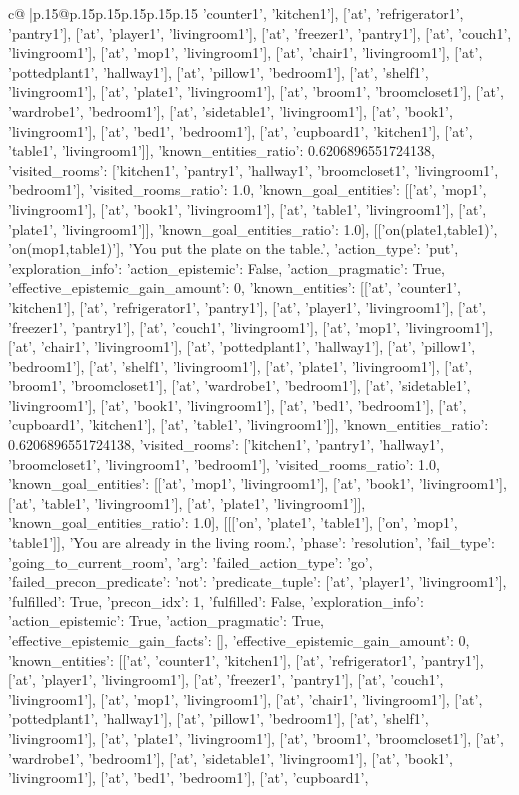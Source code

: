 \documentclass{article}
\begin{document}
{\begin{supertabular}{c@{$\;$}|p{.15\linewidth}@{}p{.15\linewidth}p{.15\linewidth}p{.15\linewidth}p{.15\linewidth}p{.15\linewidth}}
{{{'counter1', 'kitchen1'], ['at', 'refrigerator1', 'pantry1'], ['at', 'player1', 'livingroom1'], ['at', 'freezer1', 'pantry1'], ['at', 'couch1', 'livingroom1'], ['at', 'mop1', 'livingroom1'], ['at', 'chair1', 'livingroom1'], ['at', 'pottedplant1', 'hallway1'], ['at', 'pillow1', 'bedroom1'], ['at', 'shelf1', 'livingroom1'], ['at', 'plate1', 'livingroom1'], ['at', 'broom1', 'broomcloset1'], ['at', 'wardrobe1', 'bedroom1'], ['at', 'sidetable1', 'livingroom1'], ['at', 'book1', 'livingroom1'], ['at', 'bed1', 'bedroom1'], ['at', 'cupboard1', 'kitchen1'], ['at', 'table1', 'livingroom1']], 'known_entities_ratio': 0.6206896551724138, 'visited_rooms': ['kitchen1', 'pantry1', 'hallway1', 'broomcloset1', 'livingroom1', 'bedroom1'], 'visited_rooms_ratio': 1.0, 'known_goal_entities': [['at', 'mop1', 'livingroom1'], ['at', 'book1', 'livingroom1'], ['at', 'table1', 'livingroom1'], ['at', 'plate1', 'livingroom1']], 'known_goal_entities_ratio': 1.0}}], [['on(plate1,table1)', 'on(mop1,table1)'], 'You put the plate on the table.', {'action_type': 'put', 'exploration_info': {'action_epistemic': False, 'action_pragmatic': True, 'effective_epistemic_gain_amount': 0, 'known_entities': [['at', 'counter1', 'kitchen1'], ['at', 'refrigerator1', 'pantry1'], ['at', 'player1', 'livingroom1'], ['at', 'freezer1', 'pantry1'], ['at', 'couch1', 'livingroom1'], ['at', 'mop1', 'livingroom1'], ['at', 'chair1', 'livingroom1'], ['at', 'pottedplant1', 'hallway1'], ['at', 'pillow1', 'bedroom1'], ['at', 'shelf1', 'livingroom1'], ['at', 'plate1', 'livingroom1'], ['at', 'broom1', 'broomcloset1'], ['at', 'wardrobe1', 'bedroom1'], ['at', 'sidetable1', 'livingroom1'], ['at', 'book1', 'livingroom1'], ['at', 'bed1', 'bedroom1'], ['at', 'cupboard1', 'kitchen1'], ['at', 'table1', 'livingroom1']], 'known_entities_ratio': 0.6206896551724138, 'visited_rooms': ['kitchen1', 'pantry1', 'hallway1', 'broomcloset1', 'livingroom1', 'bedroom1'], 'visited_rooms_ratio': 1.0, 'known_goal_entities': [['at', 'mop1', 'livingroom1'], ['at', 'book1', 'livingroom1'], ['at', 'table1', 'livingroom1'], ['at', 'plate1', 'livingroom1']], 'known_goal_entities_ratio': 1.0}}], [[['on', 'plate1', 'table1'], ['on', 'mop1', 'table1']], 'You are already in the living room.', {'phase': 'resolution', 'fail_type': 'going_to_current_room', 'arg': {'failed_action_type': 'go', 'failed_precon_predicate': {'not': {'predicate_tuple': ['at', 'player1', 'livingroom1'], 'fulfilled': True, 'precon_idx': 1}, 'fulfilled': False}}, 'exploration_info': {'action_epistemic': True, 'action_pragmatic': True, 'effective_epistemic_gain_facts': [], 'effective_epistemic_gain_amount': 0, 'known_entities': [['at', 'counter1', 'kitchen1'], ['at', 'refrigerator1', 'pantry1'], ['at', 'player1', 'livingroom1'], ['at', 'freezer1', 'pantry1'], ['at', 'couch1', 'livingroom1'], ['at', 'mop1', 'livingroom1'], ['at', 'chair1', 'livingroom1'], ['at', 'pottedplant1', 'hallway1'], ['at', 'pillow1', 'bedroom1'], ['at', 'shelf1', 'livingroom1'], ['at', 'plate1', 'livingroom1'], ['at', 'broom1', 'broomcloset1'], ['at', 'wardrobe1', 'bedroom1'], ['at', 'sidetable1', 'livingroom1'], ['at', 'book1', 'livingroom1'], ['at', 'bed1', 'bedroom1'], ['at', 'cupboard1', }}}
\end{supertabular}}
\end{document}
